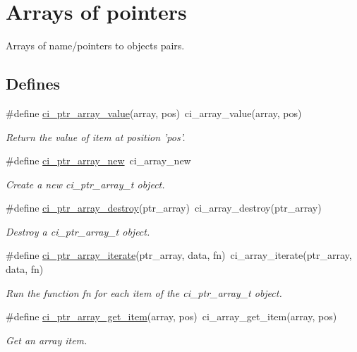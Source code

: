 \hypertarget{group__PTR__ARRAYS}{
\section{Arrays of pointers}
\label{group__PTR__ARRAYS}
}


Arrays of name/pointers to objects pairs.  
\subsection*{Defines}
\begin{DoxyCompactItemize}
\item 
\#define \hyperlink{group__PTR__ARRAYS_ga7c8945c7c3dbdddd2d2df99186bcf1f1}{ci\_\-ptr\_\-array\_\-value}(array, pos)~ci\_\-array\_\-value(array, pos)
\begin{DoxyCompactList}\small\item\em Return the value of item at position 'pos'. \item\end{DoxyCompactList}\item 
\#define \hyperlink{group__PTR__ARRAYS_gaa8d81dcc1ca7ab9beeb79ff5cb17b9b4}{ci\_\-ptr\_\-array\_\-new}~ci\_\-array\_\-new
\begin{DoxyCompactList}\small\item\em Create a new ci\_\-ptr\_\-array\_\-t object. \item\end{DoxyCompactList}\item 
\#define \hyperlink{group__PTR__ARRAYS_ga670e8fc238f88ff9b93c9d4478549153}{ci\_\-ptr\_\-array\_\-destroy}(ptr\_\-array)~ci\_\-array\_\-destroy(ptr\_\-array)
\begin{DoxyCompactList}\small\item\em Destroy a ci\_\-ptr\_\-array\_\-t object. \item\end{DoxyCompactList}\item 
\#define \hyperlink{group__PTR__ARRAYS_ga407fe3c0c3ccd87635de7dc2b3b8c1b9}{ci\_\-ptr\_\-array\_\-iterate}(ptr\_\-array, data, fn)~ci\_\-array\_\-iterate(ptr\_\-array, data, fn)
\begin{DoxyCompactList}\small\item\em Run the function fn for each item of the ci\_\-ptr\_\-array\_\-t object. \item\end{DoxyCompactList}\item 
\#define \hyperlink{group__PTR__ARRAYS_gadb3b7e1e10a8832240291d8d45b173f9}{ci\_\-ptr\_\-array\_\-get\_\-item}(array, pos)~ci\_\-array\_\-get\_\-item(array, pos)
\begin{DoxyCompactList}\small\item\em Get an array item. \item\end{DoxyCompactList}\end{DoxyCompactItemize}
